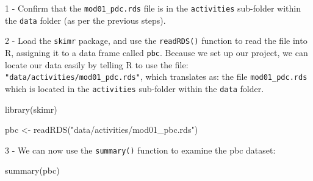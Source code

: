 \documentclass[
  a4paper,
]{memoir}
\newenvironment{Shaded}{\begin{snugshade}}{\end{snugshade}}
\newcommand{\FunctionTok}[1]{\textcolor[rgb]{0.00,0.00,0.00}{#1}}
\newcommand{\NormalTok}[1]{\textcolor[rgb]{0.00,0.00,0.00}{#1}}
\newcommand{\OtherTok}[1]{\textcolor[rgb]{0.00,0.00,0.00}{#1}}
\newcommand{\StringTok}[1]{\textcolor[rgb]{0.00,0.00,0.00}{#1}}
\begin{document}
\begin{tcolorbox}[enhanced jigsaw, title={TASK}, opacitybacktitle=0.6, colbacktitle=quarto-callout-note-color!10!white, titlerule=0mm, colframe=quarto-callout-note-color-frame, opacityback=0, left=2mm, breakable, bottomtitle=1mm, coltitle=black, bottomrule=.15mm, arc=.35mm, rightrule=.15mm, toptitle=1mm, colback=white, toprule=.15mm, leftrule=.75mm]

1 - Confirm that the \texttt{mod01\_pdc.rds} file is in the
\texttt{activities} sub-folder within the \texttt{data} folder (as per
the previous steps).

2 - Load the \texttt{skimr} package, and use the \texttt{readRDS()}
function to read the file into R, assigning it to a data frame called
\texttt{pbc}. Because we set up our project, we can locate our data
easily by telling R to use the file:
\texttt{"data/activities/mod01\_pdc.rds"}, which translates as: the file
\texttt{mod01\_pdc.rds} which is located in the \texttt{activities}
sub-folder within the \texttt{data} folder.

\begin{Shaded}
\begin{Highlighting}[]
\FunctionTok{library}\NormalTok{(skimr)}

\NormalTok{pbc }\OtherTok{\textless{}{-}} \FunctionTok{readRDS}\NormalTok{(}\StringTok{"data/activities/mod01\_pbc.rds"}\NormalTok{)}
\end{Highlighting}
\end{Shaded}

3 - We can now use the \texttt{summary()} function to examine the pbc
dataset:

\begin{Shaded}
\begin{Highlighting}[]
\FunctionTok{summary}\NormalTok{(pbc)}
\end{Highlighting}
\end{Shaded}


\end{tcolorbox}
\end{document}
